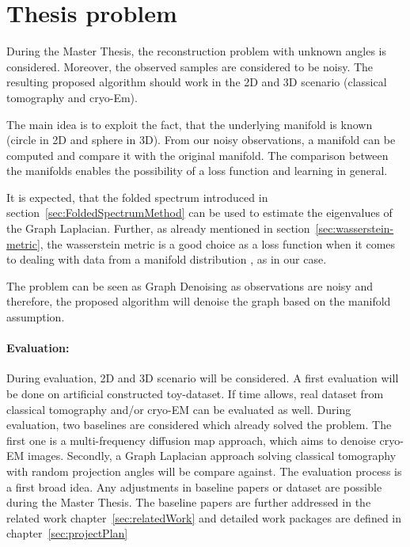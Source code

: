 \section{Thesis problem}
During the Master Thesis, the reconstruction problem with unknown angles is considered. 
Moreover, the observed samples are considered to be noisy. 
The resulting proposed algorithm should work in the 2D and 3D scenario (classical tomography and cryo-Em).

The main idea is to exploit the fact, that the underlying manifold is known (circle in 2D and sphere in 3D). 
From our noisy observations, a manifold can be computed and compare it with the original manifold.
The comparison between the manifolds enables the possibility of a loss function and learning in general.

It is expected, that the folded spectrum \cite{foldedSpectrumMethod} introduced in section~\ref{sec:FoldedSpectrumMethod}
can be used to estimate the eigenvalues of the Graph Laplacian.
Further, as already mentioned in section~\ref{sec:wasserstein-metric}, the wasserstein metric is a good choice
as a loss function when it comes to dealing with data from a manifold distribution \cite{wassersteinGAN}, as in our case. 

The problem can be seen as Graph Denoising as observations are noisy and therefore, the proposed algorithm 
will denoise the graph based on the manifold assumption. 


\paragraph{Evaluation:}
During evaluation, 2D and 3D scenario will be considered. A first evaluation will be done on artificial constructed
toy-dataset. If time allows, real dataset from classical tomography and/or cryo-EM can be evaluated as well.
During evaluation, two baselines are considered which already solved the problem. The first one is a multi-frequency diffusion 
map approach\cite{multiDiffusionMaps, cryoEmMutliDM}, which aims to denoise cryo-EM images. 
Secondly, \cite{LaplaceRandomProjections} a Graph Laplacian approach solving classical tomography with random projection angles will be compare against.
The evaluation process is a first broad idea. Any adjustments in baseline papers or dataset are possible during 
the Master Thesis. The baseline papers are further addressed in the related work chapter~\ref{sec:relatedWork}
and detailed work packages are defined in chapter~\ref{sec:projectPlan}
